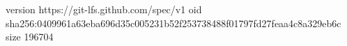 version https://git-lfs.github.com/spec/v1
oid sha256:0409961a63eba696d35c005231b52f253738488f01797fd27feaa4c8a329eb6c
size 196704
